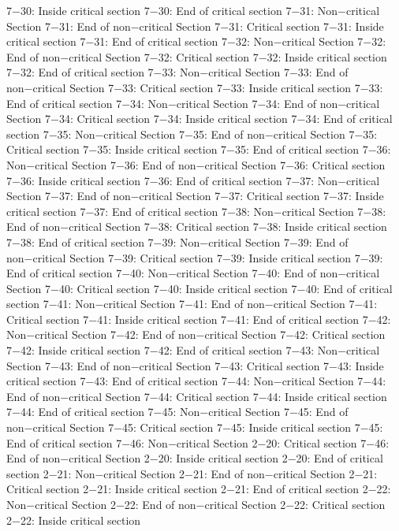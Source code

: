 7−30: Inside critical section
7−30: End of critical section
7−31: Non−critical Section
7−31: End of non−critical Section
7−31: Critical section
7−31: Inside critical section
7−31: End of critical section
7−32: Non−critical Section
7−32: End of non−critical Section
7−32: Critical section
7−32: Inside critical section
7−32: End of critical section
7−33: Non−critical Section
7−33: End of non−critical Section
7−33: Critical section
7−33: Inside critical section
7−33: End of critical section
7−34: Non−critical Section
7−34: End of non−critical Section
7−34: Critical section
7−34: Inside critical section
7−34: End of critical section
7−35: Non−critical Section
7−35: End of non−critical Section
7−35: Critical section
7−35: Inside critical section
7−35: End of critical section
7−36: Non−critical Section
7−36: End of non−critical Section
7−36: Critical section
7−36: Inside critical section
7−36: End of critical section
7−37: Non−critical Section
7−37: End of non−critical Section
7−37: Critical section
7−37: Inside critical section
7−37: End of critical section
7−38: Non−critical Section
7−38: End of non−critical Section
7−38: Critical section
7−38: Inside critical section
7−38: End of critical section
7−39: Non−critical Section
7−39: End of non−critical Section
7−39: Critical section
7−39: Inside critical section
7−39: End of critical section
7−40: Non−critical Section
7−40: End of non−critical Section
7−40: Critical section
7−40: Inside critical section
7−40: End of critical section
7−41: Non−critical Section
7−41: End of non−critical Section
7−41: Critical section
7−41: Inside critical section
7−41: End of critical section
7−42: Non−critical Section
7−42: End of non−critical Section
7−42: Critical section
7−42: Inside critical section
7−42: End of critical section
7−43: Non−critical Section
7−43: End of non−critical Section
7−43: Critical section
7−43: Inside critical section
7−43: End of critical section
7−44: Non−critical Section
7−44: End of non−critical Section
7−44: Critical section
7−44: Inside critical section
7−44: End of critical section
7−45: Non−critical Section
7−45: End of non−critical Section
7−45: Critical section
7−45: Inside critical section
7−45: End of critical section
7−46: Non−critical Section
2−20: Critical section
7−46: End of non−critical Section
2−20: Inside critical section
2−20: End of critical section
2−21: Non−critical Section
2−21: End of non−critical Section
2−21: Critical section
2−21: Inside critical section
2−21: End of critical section
2−22: Non−critical Section
2−22: End of non−critical Section
2−22: Critical section
2−22: Inside critical section
